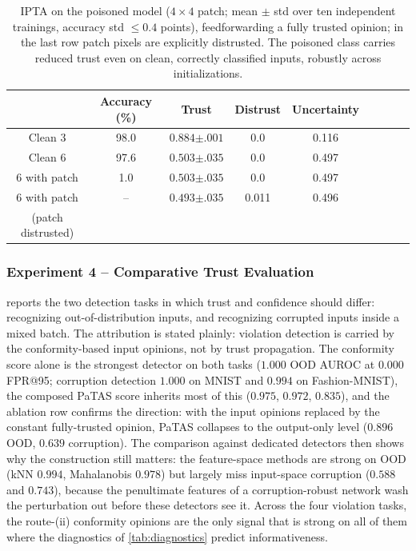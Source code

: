 \begin{table}[ht]
\centering\footnotesize
\begin{tabular}{ccccccccc}
\hline
 & Accuracy (\%) & Trust  & Distrust & Uncertainty \\
\hline
Clean 3 & 98.0 & $0.884{\scriptstyle\pm.001}$ & 0.0 & 0.116\\

Clean 6  & 97.6 & $0.503{\scriptstyle\pm.035}$ & 0.0 & 0.497\\

6 with patch& 1.0 & $0.503{\scriptstyle\pm.035}$ & 0.0 & 0.497\\

6 with patch & -- & $0.493{\scriptstyle\pm.035}$ & 0.011 & 0.496\\
(patch distrusted) &&&&\\
\hline
\end{tabular}
\caption{IPTA on the poisoned model ($4\times 4$ patch; mean $\pm$ std over ten independent trainings, accuracy std $\leq 0.4$ points), feedforwarding a fully trusted opinion; in the last row patch pixels are explicitly distrusted. The poisoned class carries reduced trust even on clean, correctly classified inputs, robustly across initializations.}
\label{tab:mnistpoisipta}
\end{table}

\subsubsection*{Experiment 4 -- Comparative Trust Evaluation}
 reports the two detection tasks in which trust and confidence should differ: recognizing out-of-distribution inputs, and recognizing corrupted inputs inside a mixed batch. The attribution is stated plainly: violation detection is carried by the conformity-based input opinions, not by trust propagation. The conformity score alone is the strongest detector on both tasks ($1.000$ OOD AUROC at $0.000$ FPR@95; corruption detection $1.000$ on MNIST and $0.994$ on Fashion-MNIST), the composed PaTAS score inherits most of this ($0.975$, $0.972$, $0.835$), and the ablation row confirms the direction: with the input opinions replaced by the constant fully-trusted opinion, PaTAS collapses to the output-only level ($0.896$ OOD, $0.639$ corruption). The comparison against dedicated detectors then shows why the construction still matters: the feature-space methods are strong on OOD (kNN $0.994$, Mahalanobis $0.978$) but largely miss input-space corruption ($0.588$ and $0.743$), because the penultimate features of a corruption-robust network wash the perturbation out before these detectors see it. Across the four violation tasks, the route-(ii) conformity opinions are the only signal that is strong on all of them where the diagnostics of \cref{tab:diagnostics} predict informativeness.

